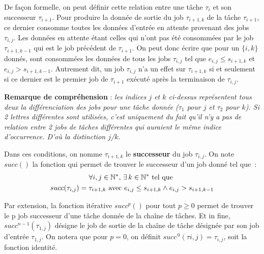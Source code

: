 \documentclass[french, a4paper, 11pt, twoside, pdftex]{StyleThese}
\begin{document}
	    De façon formelle, on peut définir cette relation entre une tâche $\tau_i$ et son successeur $\tau_{i+1}$. Pour produire la donnée de sortie du job $\tau_{i+1,k}$ de la tâche $\tau_{i+1}$, ce dernier consomme toutes les données d'entrée en attente provenant des jobs $\tau_{i,j}$. Les données en attente étant celles qui n'ont pas été consommées par le job $\tau_{i+1,k-1}$ qui est le job précédent de $\tau_{i+1}$. On peut donc écrire que pour un $\{i,k\}$ donnés, sont consommées les données de tous les jobs $\tau_{i,j}$ tel que $ e_{i,j} \leq s_{i+1, k}$ et $e_{i,j} > s_{i+1, k-1}$. Autrement dit, un job $\tau_{i,j}$ n'a un effet sur $\tau_{i+1,k}$ si et seulement si ce dernier est le premier job de $\tau_{i+1}$ exécuté après la terminaison de $\tau_{i,j}$.
	    
	    \textbf{Remarque de compréhension} : \textit{les indices $j$ et $k$ ci-dessus représentent tous deux la différenciation des jobs pour une tâche donnée ($\tau_1$ pour $j$ et $\tau_2$ pour $k$). Si 2 lettres différentes sont utilisées, c'est uniquement du fait qu'il n'y a pas de relation entre 2 jobs de tâches différentes qui auraient le même indice d'occurrence. D'où la distinction $j$/$k$}.
	    
		Dans ces conditions, on nomme $\tau_{i+1,k}$ le \textbf{successeur} du job $\tau_{i,j}$. On note $succ()$ la fonction qui permet de trouver le successeur d'un job donné tel que~: 
		\begin{multline*}
		\forall i,j \in \mathbb{N}^*, \, \exists \, k \in  \mathbb{N}^*  \textrm{ tel que }  \\
		 succ(\tau_{i,j}) = \tau_{i+1,k} \textup{ avec } e_{i,j} \leq s_{i+1,k} \wedge e_{i,j} > s_{i+1,k-1}
		\end{multline*}
	
	
		Par extension, la fonction itérative $succ^{p}()$ pour tout $p \geq 0$ permet de trouver le p job successeur d'une tâche donnée de la chaîne de tâches. Et in fine, $succ^{n-1}(\tau_{1,j})$ désigne le job de sortie de la chaîne de tâche désignée par son job d'entrée $\tau_{1,j}$. On notera que pour $p = 0$, on définit $succ^{\,0}(\tau{i,j}) = \tau_{i,j}$, soit la fonction identité.
		
\end{document}
